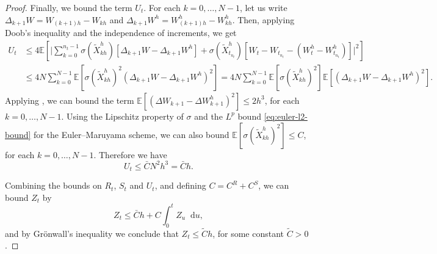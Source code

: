 \documentclass[10pt,a4paper]{amsart}
\def\E{{\mathbb E}}
\newcommand{\D}{\mathop{}\!\mathrm{d}}
\begin{document}
\begin{proof}
	Finally, we bound the term $U_t$. For each $k = 0, \dotsc, N - 1$, let us write $\Delta_{k+1} W = W_{(k+1)h} - W_{kh}$ and $\Delta_{k+1} W^h = W^h_{(k+1)h} - W^h_{kh}$. Then, applying Doob's inequality and the independence of increments, we get
	\begin{equation}
		\begin{split}
			U_t & \leq 4 \E \!\left[\bigg\lvert \sum_{k = 0}^{n_t - 1} \sigma(\tilde{X}^h_{{kh}}) \!\left[\Delta_{k+1} W - \Delta_{k+1} W^h \right] + \sigma(\tilde{X}^h_{t_{n_t}}) \!\left[W_t - W_{t_{n_t}} - (W^h_t - W^h_{t_{n_t}})\right]\bigg \rvert^2 \right]\\
			& \leq 4N\sum_{k = 0}^{N-1} \E \!\left[\sigma(\tilde{X}^h_{kh})^2(\Delta_{k+1} W - \Delta_{k+1} W^h)^2\right] = 4 N \sum_{k = 0}^{N - 1}\E \!\left[\sigma(\tilde{X}^h_{kh})^2\right]\E \!\left[(\Delta_{k+1} W - \Delta_{k+1} W^h)^2\right].
		\end{split}
	\end{equation}
	Applying , we can bound the term $\E[(\Delta W_{k+1} - \Delta W^h_{k+1})^2] \le 2h^{3}$, for each $k = 0, \dotsc, N - 1$. Using the Lipschitz property of $\sigma$ and the $L^p$ bound \eqref{eq:euler-l2-bound} for the Euler--Maruyama scheme, we can also bound $\E[\sigma(\tilde{X}^h_{kh})^2] \leq C$, for each $k = 0, \dotsc, N - 1$. Therefore we have
	\begin{equation}
		U_t \leq \bar{C} N^2 h^3 = \bar{C} h.
	\end{equation}
	
	Combining the bounds on $R_t$, $S_t$ and $U_t$, and defining $C = C^R + C^S$, we can bound $Z_t$ by
	\begin{equation}
		Z_t \leq \bar{C}h + C \int_0^t Z_u \D u,
	\end{equation}
	and by Gr\"onwall's inequality we conclude that $Z_t \leq \tilde{C} h$, for some constant $\tilde C >0$.
\end{proof}
\end{document}

